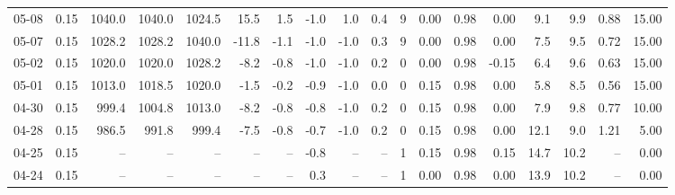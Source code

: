 \begin{threeparttable}
{\begin{tabular}{lrrrrrrrrrrrrrrrrr}
  05-08 &     0.15 & 1040.0 & 1040.0 & 1024.5 &       15.5 &            1.5 &                      -1.0 &                      1.0 &                 0.4 &              9 &       0.00 &      0.98 &           0.00 &              9.1 &                 9.9 &            0.88 &                  15.00 \\
  05-07 &     0.15 & 1028.2 & 1028.2 & 1040.0 &      -11.8 &           -1.1 &                      -1.0 &                     -1.0 &                 0.3 &              9 &       0.00 &      0.98 &           0.00 &              7.5 &                 9.5 &            0.72 &                  15.00 \\
  05-02 &     0.15 & 1020.0 & 1020.0 & 1028.2 &       -8.2 &           -0.8 &                      -1.0 &                     -1.0 &                 0.2 &              0 &       0.00 &      0.98 &          -0.15 &              6.4 &                 9.6 &            0.63 &                  15.00 \\
  05-01 &     0.15 & 1013.0 & 1018.5 & 1020.0 &       -1.5 &           -0.2 &                      -0.9 &                     -1.0 &                 0.0 &              0 &       0.15 &      0.98 &           0.00 &              5.8 &                 8.5 &            0.56 &                  15.00 \\
  04-30 &     0.15 &  999.4 & 1004.8 & 1013.0 &       -8.2 &           -0.8 &                      -0.8 &                     -1.0 &                 0.2 &              0 &       0.15 &      0.98 &           0.00 &              7.9 &                 9.8 &            0.77 &                  10.00 \\
  04-28 &     0.15 &  986.5 &  991.8 &  999.4 &       -7.5 &           -0.8 &                      -0.7 &                     -1.0 &                 0.2 &              0 &       0.15 &      0.98 &           0.00 &             12.1 &                 9.0 &            1.21 &                   5.00 \\
  04-25 &     0.15 &     -- &     -- &     -- &         -- &             -- &                      -0.8 &                       -- &                  -- &              1 &       0.15 &      0.98 &           0.15 &             14.7 &                10.2 &              -- &                   0.00 \\
  04-24 &     0.15 &     -- &     -- &     -- &         -- &             -- &                       0.3 &                       -- &                  -- &              1 &       0.00 &      0.98 &           0.00 &             13.9 &                10.2 &              -- &                   0.00 \\

\end{tabular}}
\end{threeparttable}
